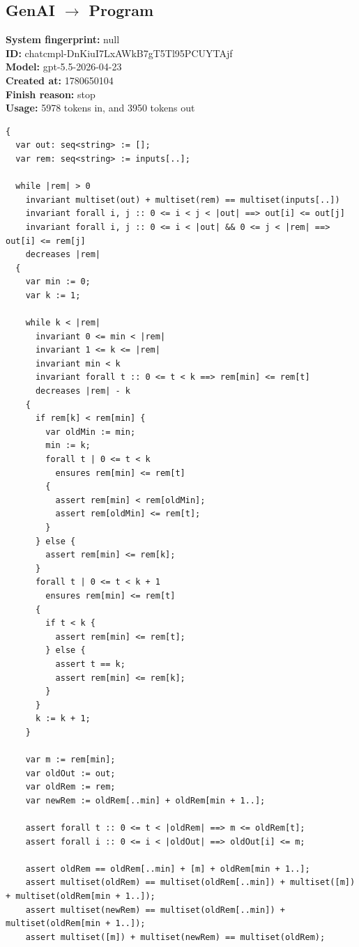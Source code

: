 \documentclass{article}
\begin{document}
\subsection*{GenAI $\rightarrow$ Program}
\textbf{System fingerprint: }null
\\\textbf{ID: }chatcmpl-DnKiuI7LxAWkB7gT5Tl95PCUYTAjf
\\\textbf{Model: }gpt-5.5-2026-04-23
\\\textbf{Created at: }1780650104
\\\textbf{Finish reason: }stop
\\\textbf{Usage: }5978 tokens in, and 3950 tokens out
\begin{lstlisting}
{
  var out: seq<string> := [];
  var rem: seq<string> := inputs[..];

  while |rem| > 0
    invariant multiset(out) + multiset(rem) == multiset(inputs[..])
    invariant forall i, j :: 0 <= i < j < |out| ==> out[i] <= out[j]
    invariant forall i, j :: 0 <= i < |out| && 0 <= j < |rem| ==> out[i] <= rem[j]
    decreases |rem|
  {
    var min := 0;
    var k := 1;

    while k < |rem|
      invariant 0 <= min < |rem|
      invariant 1 <= k <= |rem|
      invariant min < k
      invariant forall t :: 0 <= t < k ==> rem[min] <= rem[t]
      decreases |rem| - k
    {
      if rem[k] < rem[min] {
        var oldMin := min;
        min := k;
        forall t | 0 <= t < k
          ensures rem[min] <= rem[t]
        {
          assert rem[min] < rem[oldMin];
          assert rem[oldMin] <= rem[t];
        }
      } else {
        assert rem[min] <= rem[k];
      }
      forall t | 0 <= t < k + 1
        ensures rem[min] <= rem[t]
      {
        if t < k {
          assert rem[min] <= rem[t];
        } else {
          assert t == k;
          assert rem[min] <= rem[k];
        }
      }
      k := k + 1;
    }

    var m := rem[min];
    var oldOut := out;
    var oldRem := rem;
    var newRem := oldRem[..min] + oldRem[min + 1..];

    assert forall t :: 0 <= t < |oldRem| ==> m <= oldRem[t];
    assert forall i :: 0 <= i < |oldOut| ==> oldOut[i] <= m;

    assert oldRem == oldRem[..min] + [m] + oldRem[min + 1..];
    assert multiset(oldRem) == multiset(oldRem[..min]) + multiset([m]) + multiset(oldRem[min + 1..]);
    assert multiset(newRem) == multiset(oldRem[..min]) + multiset(oldRem[min + 1..]);
    assert multiset([m]) + multiset(newRem) == multiset(oldRem);


\end{lstlisting}
\end{document}
